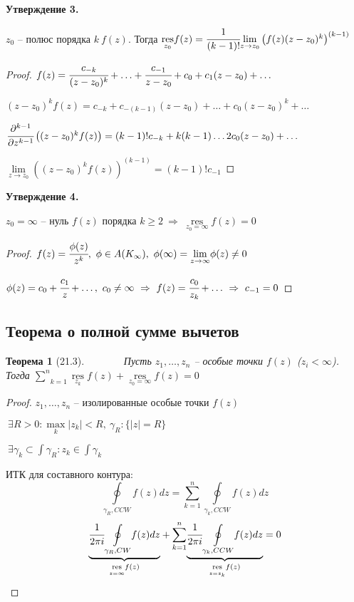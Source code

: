 \documentclass[final]{report}
\newcommand{\res}{\mathop{\mathrm{res}}\nolimits}
\renewcommand{\bf}{\bfseries}
\newcommand{\forcenewline}{$\phantom{\mbox{newline}}$\newline}
\newcommand{\dd}{\partial}
\newcommand{\then}{\ \Rightarrow\ }
\newcommand{\moint}[1]{\underset{#1}{\oint}}
\newcommand{\msum}[2]{\underset{#1}{\overset{#2}{\sum}}}
\newcommand{\mlim}[1]{\underset{#1}{\lim}}
\newcommand{\mres}[1]{\underset{#1}{\res}}
\newcommand{\g}{\gamma}
\renewcommand{\f}{\phi}
\newcommand{\E}{\ \exists}
\newtheorem*{theor}{Теорема}
\theoremstyle{remark}
\begin{document}
{\bf Утверждение 3.}

$z_0$ -- полюс порядка $k\ f(z)$. Тогда $\mres{z_0}f(z)=\cfrac{1}{(k-1)!}\mlim{z\to z_0}\left(f(z)(z-z_0)^k\right)^{(k-1)}$

\begin{proof}
$f(z)=\cfrac{c_{-k}}{(z-z_0)^k}+\ldots+\cfrac{c_{-1}}{z-z_0}+c_0+c_1(z-z_0)+\ldots$

$(z-z_0)^kf(z)=c_{-k}+c_{-(k-1)}(z-z_0)+\ldots+c_0(z-z_0)^k+\ldots$

$\cfrac{\dd^{k-1}}{\dd z^{k-1}}\left((z-z_0)^kf(z)\right)=(k-1)!c_{-k}+k(k-1)\ldots2c_0(z-z_0)+\ldots$

$\mlim{z\to z_0}\left((z-z_0)^kf(z)\right)^{(k-1)}=(k-1)!c_{-1}$
\end{proof}

{\bf Утверждение 4.}

$z_0=\infty$ -- нуль $f(z)$ порядка $k\geq2\then\mres{z_0=\infty}f(z)=0$
\begin{proof}
$f(z)=\cfrac{\f(z)}{z^k},\ \f\in A(K_\infty),\ \f(\infty)=\mlim{z\to\infty}\f(z)\neq0$

$\f(z)=c_0+\cfrac{c_1}z+\ldots,\ c_0\neq\infty\then f(z)=\cfrac{c_0}{z_k}+\ldots\then c_{-1}=0$
\end{proof}

\subsection{Теорема о полной сумме вычетов}

\begin{theor}[21.3]
\forcenewline
Пусть $z_1,\ldots,z_n$ -- особые точки $f(z)$ ($z_i<\infty$). Тогда $\msum{k=1}{n}\mres{z_k}f(z)+\mres{z_0=\infty}f(z)=0$
\end{theor}

\begin{proof}
$z_1,\ldots,z_n$ -- изолированные особые точки $f(z)$

$\E R>0\colon\underset{k}{\max}|z_k|<R,\ \g_R\colon\{|z|=R\}$

$\E\g_k\subset\int\g_R\colon z_k\in\int\g_k$

ИТК для составного контура:
$$
\moint{\g_R,CCW}f(z)dz=\msum{k=1}{n}\moint{\g_k,CCW}f(z)dz
$$
$$
\underset{\mres{z=\infty}f(z)}{\underbrace{\cfrac{1}{2\pi i}\moint{\g_R,CW}f(z)dz}}+\msum{k=1}{n}\underset{\mres{z=z_k}f(z)}{\underbrace{\cfrac{1}{2\pi i}\moint{\g_k,CCW}f(z)dz}}=0
$$
\end{proof}

\newpage
\end{document}
